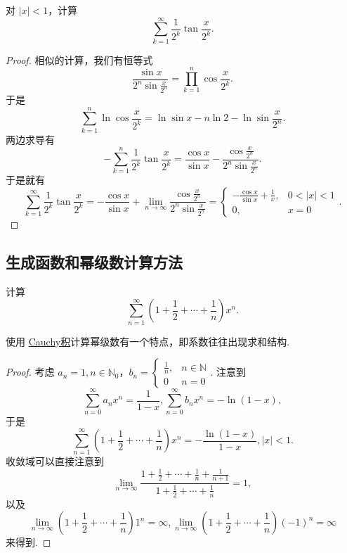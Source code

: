 \documentclass[../../main.tex]{subfiles}
\begin{document}
\begin{example}
对 \(|x| < 1\)，计算
\[
\sum_{k=1}^{\infty} \frac{1}{2^k} \tan \frac{x}{2^k}.
\]
\end{example}
\begin{proof}
相似的计算，我们有恒等式
\[
\frac{\sin x}{2^n \sin \frac{x}{2^n}} = \prod_{k=1}^{n} \cos \frac{x}{2^k}.
\]
于是
\[
\sum_{k=1}^{n} \ln \cos \frac{x}{2^k}=\ln \sin x - n \ln 2 - \ln \sin \frac{x}{2^n}.
\]
两边求导有
\[
- \sum_{k=1}^{n} \frac{1}{2^k} \tan \frac{x}{2^k} = \frac{\cos x}{\sin x} - \frac{\cos \frac{x}{2^n}}{2^n \sin \frac{x}{2^n}}.
\]
于是就有
\[
\sum_{k=1}^{\infty} \frac{1}{2^k} \tan \frac{x}{2^k} = - \frac{\cos x}{\sin x} + \lim_{n \to \infty} \frac{\cos \frac{x}{2^n}}{2^n \sin \frac{x}{2^n}} = 
\begin{cases} 
- \frac{\cos x}{\sin x} + \frac{1}{x}, & 0 < |x| < 1 \\
0, & x = 0 
\end{cases}.
\]
\end{proof}



\subsection{生成函数和幂级数计算方法}

\begin{example}
计算
\[
\sum_{n=1}^{\infty} \left(1 + \frac{1}{2} + \cdots + \frac{1}{n}\right) x^n.
\]
\end{example}
\begin{note}
使用 \hyperref[definition:Cauchy积]{Cauchy积}计算幂级数有一个特点，即系数往往出现求和结构.
\end{note}
\begin{proof}
考虑 \(a_n = 1, n \in \mathbb{N}_0\)，\(b_n = \begin{cases} \frac{1}{n}, & n \in \mathbb{N} \\ 0 & n = 0 \end{cases}\). 注意到
\[
\sum_{n=0}^{\infty} a_n x^n = \frac{1}{1 - x}, \sum_{n=0}^{\infty} b_n x^n = -\ln (1 - x),
\]
于是
\[
\sum_{n=1}^{\infty} \left(1 + \frac{1}{2} + \cdots + \frac{1}{n}\right) x^n = -\frac{\ln (1 - x)}{1 - x}, |x| < 1.
\]
收敛域可以直接注意到
\[
\lim_{n \to \infty} \frac{1 + \frac{1}{2} + \cdots + \frac{1}{n} + \frac{1}{n + 1}}{1 + \frac{1}{2} + \cdots + \frac{1}{n}} = 1,
\]
以及
\[
\lim_{n \to \infty} \left(1 + \frac{1}{2} + \cdots + \frac{1}{n}\right) 1^n = \infty, \lim_{n \to \infty} \left(1 + \frac{1}{2} + \cdots + \frac{1}{n}\right) (-1)^n = \infty
\]
来得到.
\end{proof}
\end{document}
